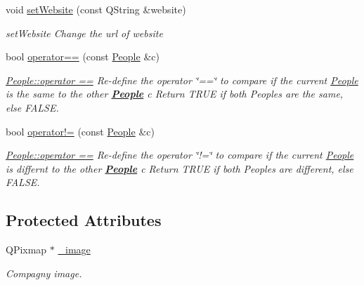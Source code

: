 \begin{DoxyCompactItemize}
void \hyperlink{classModels_1_1People_acd66787d72c4b69a04d0ce228260b784}{set\-Website} (const Q\-String \&website)
\begin{DoxyCompactList}\small\item\em set\-Website Change the url of website \end{DoxyCompactList}\item 
bool \hyperlink{classModels_1_1People_a1c875989cffc3119ff1f263c7898bbdb}{operator==} (const \hyperlink{classModels_1_1People}{People} \&c)
\begin{DoxyCompactList}\small\item\em \hyperlink{classModels_1_1People_a1c875989cffc3119ff1f263c7898bbdb}{People\-::operator ==} Re-\/define the operator \char`\"{}==\char`\"{} to compare if the current \hyperlink{classModels_1_1People}{People} is the same to the other {\bfseries \hyperlink{classModels_1_1People}{People}} {\itshape c} Return T\-R\-U\-E if both Peoples are the same, else F\-A\-L\-S\-E. \end{DoxyCompactList}\item 
bool \hyperlink{classModels_1_1People_afcc4f66db1e1b1deefb849fffe82d616}{operator!=} (const \hyperlink{classModels_1_1People}{People} \&c)
\begin{DoxyCompactList}\small\item\em \hyperlink{classModels_1_1People_a1c875989cffc3119ff1f263c7898bbdb}{People\-::operator ==} Re-\/define the operator \char`\"{}!=\char`\"{} to compare if the current \hyperlink{classModels_1_1People}{People} is differnt to the other {\bfseries \hyperlink{classModels_1_1People}{People}} {\itshape c} Return T\-R\-U\-E if both Peoples are different, else F\-A\-L\-S\-E. \end{DoxyCompactList}\end{DoxyCompactItemize}
\subsection*{Protected Attributes}
\begin{DoxyCompactItemize}
\item 
\hypertarget{classModels_1_1People_a8638e8e2640a02e1e75c383ddb5e49eb}{Q\-Pixmap $\ast$ \hyperlink{classModels_1_1People_a8638e8e2640a02e1e75c383ddb5e49eb}{\-\_\-image}}\label{classModels_1_1People_a8638e8e2640a02e1e75c383ddb5e49eb}

\begin{DoxyCompactList}\small\item\em Compagny image. \end{DoxyCompactList}\end{DoxyCompactItemize}


